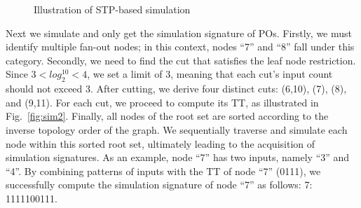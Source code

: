 \documentclass[conference]{IEEEtran}
\begin{document}
\begin{figure}[t]
  \centering  %
  \subfigbottomskip=-4pt %
  \subfigcapskip=-5pt %
      \hspace{15mm}
  \caption{Illustration of STP-based simulation}
  \label{fig:sim}
  \vspace{-2mm}
\end{figure}

Next we simulate and only get the simulation signature of POs.
Firstly, we must identify multiple fan-out nodes; in this context, nodes ``7'' and ``8'' fall under this category.
Secondly, we need to find the cut that satisfies the leaf node restriction. 
Since $3 < log_2^{10} < 4$, we set a limit of 3, meaning that each cut's input count should not exceed 3.
After cutting, we derive four distinct cuts: (6,10), (7), (8), and (9,11). 
For each cut, we proceed to compute its TT, as illustrated in Fig.~\ref{fig:sim2}.
Finally, all nodes of the root set are sorted according to the inverse topology order of the graph. 
We sequentially traverse and simulate each node within this sorted root set, ultimately leading to the acquisition of simulation signatures.
As an example, node ``7'' has two inputs, namely ``3'' and ``4''.
By combining patterns of inputs with the TT of node ``7'' (0111), we successfully compute the simulation signature of node ``7'' as follows: 7: 1111100111.
\end{document}
